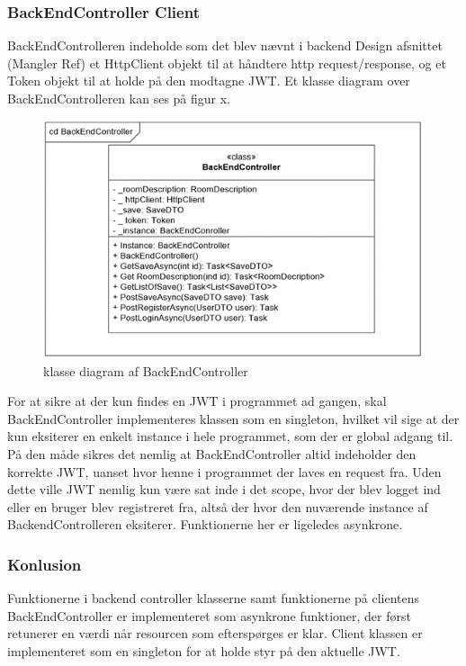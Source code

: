 \subsubsection{BackEndController Client}
BackEndControlleren indeholde som det blev nævnt i backend Design afsnittet (Mangler Ref) et HttpClient objekt til at håndtere http request/response, og et Token objekt til at holde på den modtagne JWT.
Et klasse diagram over BackEndControlleren kan ses på figur x.\\

\begin{figure}[H]
\centering
\includegraphics[width = \textwidth]{02-Body/Images/Backend_klasse_BackEndController.PNG}
\caption{klasse diagram af BackEndController}
\label{fig:Arkitektur-Backend-Klasse-BackEndController}
\end{figure}

For at sikre at der kun findes en JWT i programmet ad gangen, skal BackEndController implementeres klassen som en singleton, hvilket vil sige at der kun eksiterer en enkelt instance i hele programmet, som der er global adgang til. På den måde sikres det nemlig at BackEndController altid indeholder den korrekte JWT, uanset hvor henne i programmet der laves en request fra. Uden dette ville JWT nemlig kun være sat inde i det scope, hvor der blev logget ind eller en bruger blev registreret fra, altså der hvor den nuværende instance af BackendControlleren eksiterer. Funktionerne her er ligeledes asynkrone.\\


\subsubsection{Konlusion}

Funktionerne i backend controller klasserne samt funktionerne på clientens BackEndController er implementeret som asynkrone funktioner, der først retunerer en værdi når resourcen som efterspørges er klar. Client klassen er implementeret som en singleton for at holde styr på den aktuelle JWT.

\newpage
